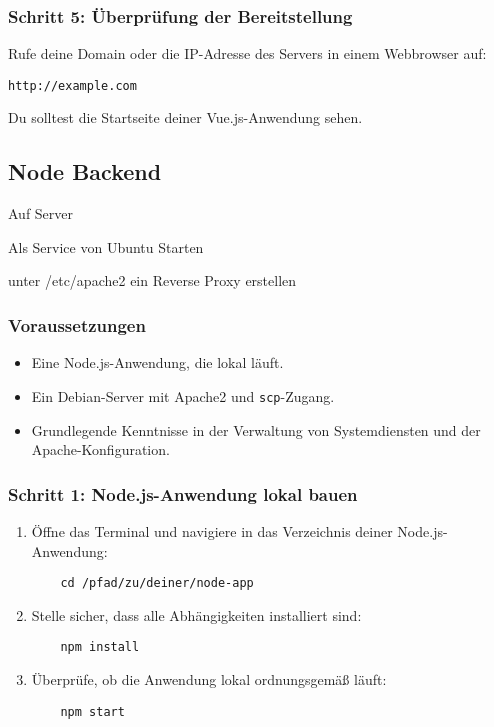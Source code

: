 \documentclass[a4paper,12pt]{article}
\begin{document}
\subsubsection{Schritt 5: Überprüfung der Bereitstellung}
Rufe deine Domain oder die IP-Adresse des Servers in einem Webbrowser auf:

\begin{lstlisting}
http://example.com
\end{lstlisting}

Du solltest die Startseite deiner Vue.js-Anwendung sehen.



\subsection{Node Backend}

Auf Server 

Als Service von Ubuntu Starten 

unter /etc/apache2  ein Reverse Proxy erstellen 

\subsubsection{Voraussetzungen}
\begin{itemize}
    \item Eine Node.js-Anwendung, die lokal läuft.
    \item Ein Debian-Server mit Apache2 und \texttt{scp}-Zugang.
    \item Grundlegende Kenntnisse in der Verwaltung von Systemdiensten und der Apache-Konfiguration.
\end{itemize}

\subsubsection{Schritt 1: Node.js-Anwendung lokal bauen}
\begin{enumerate}
    \item Öffne das Terminal und navigiere in das Verzeichnis deiner Node.js-Anwendung:
    
    \begin{lstlisting}
    cd /pfad/zu/deiner/node-app
    \end{lstlisting}
    
    \item Stelle sicher, dass alle Abhängigkeiten installiert sind:

    \begin{lstlisting}
    npm install
    \end{lstlisting}
    
    \item Überprüfe, ob die Anwendung lokal ordnungsgemäß läuft:

    \begin{lstlisting}
    npm start
    \end{lstlisting}
\end{enumerate}
\end{document}
